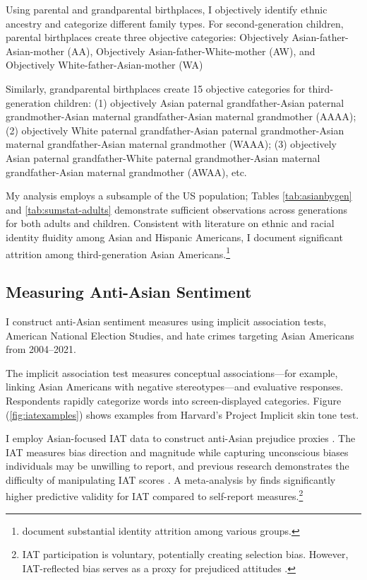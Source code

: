 Using parental and grandparental birthplaces, I objectively identify ethnic ancestry and categorize different family types. For second-generation children, parental birthplaces create three objective categories: Objectively Asian-father-Asian-mother (AA), Objectively Asian-father-White-mother (AW), and Objectively White-father-Asian-mother (WA)

Similarly, grandparental birthplaces create 15 objective categories for third-generation children: (1) objectively Asian paternal grandfather-Asian paternal grandmother-Asian maternal grandfather-Asian maternal grandmother (AAAA); (2) objectively White paternal grandfather-Asian paternal grandmother-Asian maternal grandfather-Asian maternal grandmother (WAAA); (3) objectively Asian paternal grandfather-White paternal grandmother-Asian maternal grandfather-Asian maternal grandmother (AWAA), etc.

My analysis employs a subsample of the US population; Tables \ref{tab:asianbygen} and \ref{tab:sumstat-adults} demonstrate sufficient observations across generations for both adults and children. Consistent with literature on ethnic and racial identity fluidity among Asian and Hispanic Americans, I document significant attrition among third-generation Asian Americans.\footnote{\textcite{duncanIdentifyingLaterGenerationDescendants2018,duncanSocioeconomicIntegrationImmigrant2018, antmanEthnicAttritionObserved2016,antmanEthnicAttritionAssimilation2020} document substantial identity attrition among various groups.}

\subsection{Measuring Anti-Asian Sentiment}\label{sub:lw-bias}

I construct anti-Asian sentiment measures using implicit association tests, American National Election Studies, and hate crimes targeting Asian Americans from 2004--2021. 

The implicit association test measures conceptual associations---for example, linking Asian Americans with negative stereotypes---and evaluative responses. Respondents rapidly categorize words into screen-displayed categories. Figure (\ref{fig:iatexamples}) shows examples from Harvard's Project Implicit skin tone test.

I employ Asian-focused IAT data to construct anti-Asian prejudice proxies \autocite{greenwaldMeasuringIndividualDifferences1998}. The IAT measures bias direction and magnitude while capturing unconscious biases individuals may be unwilling to report, and previous research demonstrates the difficulty of manipulating IAT scores \autocite{egloffPredictiveValidityImplicit2002}. A meta-analysis by \textcite{greenwaldMeasuringIndividualDifferences1998} finds significantly higher predictive validity for IAT compared to self-report measures.\footnote{IAT participation is voluntary, potentially creating selection bias. However, IAT-reflected bias serves as a proxy for prejudiced attitudes \autocite{chettyRaceEconomicOpportunity2020}.} 

